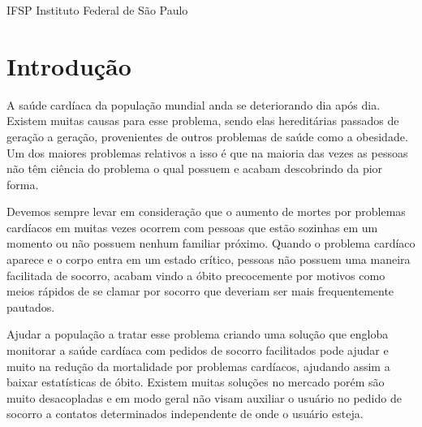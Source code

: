 \documentclass[
	12pt,				%
	openright,			%
	a4paper,			%
	oneside, 
	chapter=TITLE,		%
	english,			%
	brazil				%
	]{abntex2}
\begin{document}
\listoffigures*
\cleardoublepage

\listoftables*
{}
\cleardoublepage

\begin{siglas}
  \item[IFSP] Instituto Federal de São Paulo
\end{siglas}



\tableofcontents*
\cleardoublepage



\textual

\chapter{Introdução}

A saúde cardíaca da população mundial anda se deteriorando dia após dia. Existem muitas causas para esse problema, sendo elas hereditárias passados de geração a geração, provenientes de outros problemas de saúde como a obesidade. Um dos maiores problemas relativos a isso é que na maioria das vezes as pessoas não têm ciência do problema o qual possuem e acabam descobrindo da pior forma.

Devemos sempre levar em consideração que o aumento de mortes por problemas cardíacos em muitas vezes ocorrem com pessoas que estão sozinhas em um momento ou não possuem nenhum familiar próximo. Quando o problema cardíaco aparece e o corpo entra em um estado crítico, pessoas não possuem uma maneira facilitada de socorro, acabam vindo a óbito precocemente por motivos como meios rápidos de se clamar por socorro que deveriam ser mais frequentemente pautados.

Ajudar a população a tratar esse problema criando uma solução que engloba monitorar a saúde cardíaca com pedidos de socorro facilitados pode ajudar e muito na redução da mortalidade por problemas cardíacos, ajudando assim a baixar estatísticas de óbito. Existem muitas soluções no mercado porém são muito desacopladas e em modo geral não visam auxiliar o usuário no pedido de socorro a contatos determinados independente de onde o usuário esteja.
\end{document}
